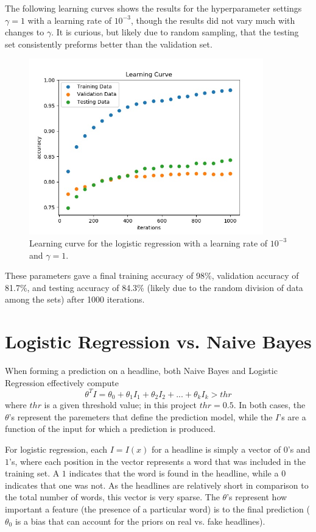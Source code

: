 \documentclass{article}
\begin{document}
   The following learning curves shows the results for the hyperparameter settings $\gamma = 1$ with a learning
   rate of $10^{-3}$, though the results did not vary much with changes to $\gamma$. It is curious, but likely due
   to random sampling, that the testing set consistently preforms better than the validation set.
   \begin{figure}[h] \centering
      \includegraphics[width=4in]{resources/part4}
      \caption{ Learning curve for the logistic regression with a learning rate of $10^{-3}$ and
            $\gamma = 1$.}
   \end{figure}

   These parameters gave a final training accuracy of 98\%, validation accuracy of 81.7\%, and testing
   accuracy of 84.3\% (likely due to the random division of data among the sets) after 1000 iterations.



   \section{Logistic Regression vs. Naive Bayes}
   When forming a prediction on a headline, both Naive Bayes and Logistic Regression effectively compute
   \begin{equation*}
      \theta^T I = \theta_0 + \theta_1 I_1 + \theta_2 I_2 + ... + \theta_k I_k > thr
   \end{equation*}
   where $thr$ is a given threshold value; in this project $thr = 0.5$. In both cases, the $\theta$'s represent
   the paremeters that define the prediction model, while the $I$'s are a function of the input for which a
   prediction is produced.

   For logistic regression, each $I = I(x)$ for a headline is simply a vector of $0$'s and $1$'s, where each
   position in the vector represents a word that was included in the training set. A $1$ indicates that the
   word is found in the headline, while a $0$ indicates that one was not. As the headlines are relatively short
   in comparison to the total number of words, this vector is very sparse. The $\theta$'s represent how important
   a feature (the presence of a particular word) is to the final prediction ($\theta_0$ is a bias that can
   account for the priors on real vs. fake headlines).
\end{document}
